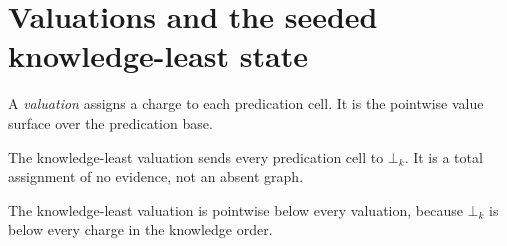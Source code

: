 \section{Valuations and the seeded knowledge-least state}

\begin{proposition}[Valuation]\label{thm:valuation}\leanok{}
A \emph{valuation} assigns a charge to each predication cell. It is the
pointwise value surface over the predication base.
\end{proposition}

\begin{proposition}\label{thm:knowledge-least}\leanok{}
The knowledge-least valuation sends every predication cell to $\bot_k$. It is
a total assignment of no evidence, not an absent graph.
\end{proposition}

\begin{theorem}\label{thm:knowledgeLeast-le}\leanok{}
The knowledge-least valuation is pointwise below every valuation, because
$\bot_k$ is below every charge in the knowledge order.
\end{theorem}

